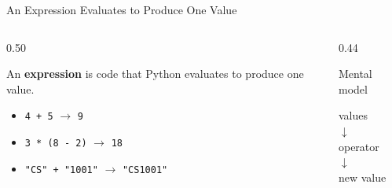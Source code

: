 \documentclass[aspectratio=169,10pt]{beamer}
\begin{document}
\begin{frame}{An Expression Evaluates to Produce One Value}

  \begin{columns}[T,onlytextwidth]

    \begin{column}{0.50\textwidth}

      \begin{cpdefinition}

        An \textbf{expression} is code that Python evaluates to produce one value.

      \end{cpdefinition}

      \begin{itemize}

        \item \texttt{4 + 5} $\rightarrow$ \texttt{9}

        \item \texttt{3 * (8 - 2)} $\rightarrow$ \texttt{18}

        \item \texttt{"CS" + "1001"} $\rightarrow$ \texttt{"CS1001"}

      \end{itemize}

    \end{column}

    \begin{column}{0.44\textwidth}

      \begin{block}{Mental model}

        \centering
        values\\[0.06in]
        $\downarrow$\\[0.06in]
        operator\\[0.06in]
        $\downarrow$\\[0.06in]
        new value

      \end{block}

    \end{column}

  \end{columns}

\end{frame}
\end{document}
